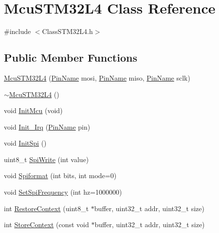 \hypertarget{class_mcu_s_t_m32_l4}{}\section{Mcu\+S\+T\+M32\+L4 Class Reference}
\label{class_mcu_s_t_m32_l4}


{\ttfamily \#include $<$Class\+S\+T\+M32\+L4.\+h$>$}

\subsection*{Public Member Functions}
\begin{DoxyCompactItemize}
\item 
\mbox{\hyperlink{class_mcu_s_t_m32_l4_a0ba47738d97cb51cbe91e2b905801a1e}{Mcu\+S\+T\+M32\+L4}} (\mbox{\hyperlink{_class_s_t_m32_l0_8h_a5ceb873075d76667eb54dc6a7d2734d1}{Pin\+Name}} mosi, \mbox{\hyperlink{_class_s_t_m32_l0_8h_a5ceb873075d76667eb54dc6a7d2734d1}{Pin\+Name}} miso, \mbox{\hyperlink{_class_s_t_m32_l0_8h_a5ceb873075d76667eb54dc6a7d2734d1}{Pin\+Name}} sclk)
\item 
\mbox{\hyperlink{class_mcu_s_t_m32_l4_a4327f119f5702e2226855371bc5b6f63}{$\sim$\+Mcu\+S\+T\+M32\+L4}} ()
\item 
void \mbox{\hyperlink{class_mcu_s_t_m32_l4_a7f05ed4d66993c6d457d3074c3d1676c}{Init\+Mcu}} (void)
\item 
void \mbox{\hyperlink{class_mcu_s_t_m32_l4_a967ed67d53d5057beba267eab1ddbf67}{Init\+\_\+\+Irq}} (\mbox{\hyperlink{_class_s_t_m32_l0_8h_a5ceb873075d76667eb54dc6a7d2734d1}{Pin\+Name}} pin)
\item 
void \mbox{\hyperlink{class_mcu_s_t_m32_l4_ae7a2747c7e002b958b3fb59a341a6055}{Init\+Spi}} ()
\item 
uint8\+\_\+t \mbox{\hyperlink{class_mcu_s_t_m32_l4_a28153235a63de20319f944b692f30585}{Spi\+Write}} (int value)
\item 
void \mbox{\hyperlink{class_mcu_s_t_m32_l4_ac532240fdffb1ca8bf5977527851269c}{Spiformat}} (int bits, int mode=0)
\item 
void \mbox{\hyperlink{class_mcu_s_t_m32_l4_a3f2001f881ae5cad3a002ea92da0a481}{Set\+Spi\+Frequency}} (int hz=1000000)
\item 
int \mbox{\hyperlink{class_mcu_s_t_m32_l4_ad18c03e3b31fb044ee51001e1c2d6688}{Restore\+Context}} (uint8\+\_\+t $\ast$buffer, uint32\+\_\+t addr, uint32\+\_\+t size)
\item 
int \mbox{\hyperlink{class_mcu_s_t_m32_l4_adb54329cc1ac2883a29a45bd6ec3476f}{Store\+Context}} (const void $\ast$buffer, uint32\+\_\+t addr, uint32\+\_\+t size)

\end{DoxyCompactItemize}
